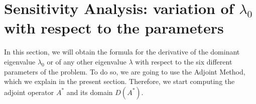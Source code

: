 \documentclass[a4paper]{article}
\numberwithin{equation}{section}
\begin{document}
\section{Sensitivity Analysis: variation of $\lambda_0$ with respect to the parameters}\label{sens}
In this section, we will obtain the formula for the derivative of the dominant eigenvalue $\lambda_0$ or of any other eigenvalue $\lambda$ with respect to the six different parameters of the problem. To do so, we are going to use the Adjoint Method, which we explain in the present section. Therefore, we start computing the adjoint operator $A^*$ and its domain $D(A^*)$.



\end{document}
